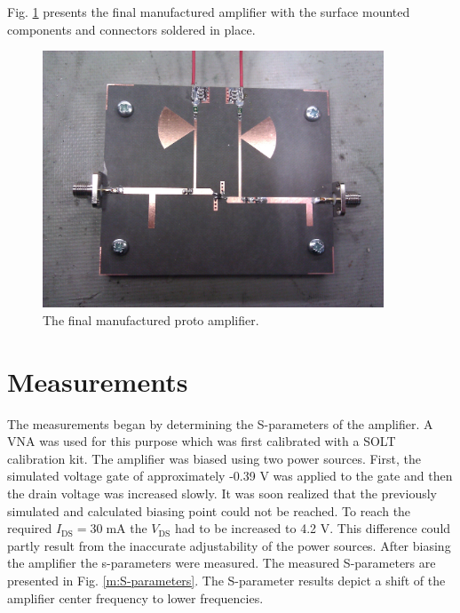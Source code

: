 \documentclass[a4paper, 12pt]{article}
\begin{document}
Fig. \ref{f:proto} presents the final manufactured amplifier with the surface mounted components and connectors soldered in place. 

\begin{figure}[!h]
	\begin{center}
	\includegraphics[width=4in]{img/proto}
	\caption{The final manufactured proto amplifier.}
	\label{f:proto}
	\end{center}
\end{figure}

\newpage
\section{Measurements}

The measurements began by determining the S-parameters of the amplifier. A VNA was used for this purpose which was first calibrated with a SOLT calibration kit. The amplifier was biased using two power sources. First, the simulated voltage gate of approximately -0.39 V was applied to the gate and then the drain voltage was increased slowly. It was soon realized that the previously simulated and calculated biasing point could not be reached. To reach the required $I_\mathrm{DS}=30 \; \mathrm{mA}$ the $V_\mathrm{DS}$ had to be increased to 4.2 V. This difference could partly result from the inaccurate adjustability of the power sources. After biasing the amplifier the s-parameters were measured. The measured S-parameters are presented in Fig. \ref{m:S-parameters}. The S-parameter results depict a shift of the amplifier center frequency to lower frequencies.  
\end{document}
